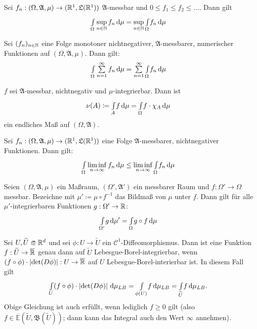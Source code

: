 \documentclass{cheat-sheet}
\newcommand{\Alg}{\mathfrak{A}}
\newcommand{\LebAlg}{\mathfrak{L}} %
\newcommand{\E}{\mathbb{E}} %
\newcommand{\ER}{\overline\R} %
\newcommand{\Bor}{\mathfrak{B}} %
\newcommand{\IntOmu}[1]{\Int{\Omega}{}{#1}{\mu}} %
\begin{document}


\begin{satz}
  Sei $f_n : (\Omega, \Alg, \mu) \to (\R^1, \LebAlg(\R^1))$ $\Alg$-messbar und $0 \leq f_1 \leq f_2 \leq ...$. Dann gilt
  \[ \IntOmu{\sup_{n \in \N} f_n} = \sup_{n \in \N} \IntOmu{f_n} \]
\end{satz}

\begin{satz}
  Sei $(f_n)_{n \in \mathbb{N}}$ eine Folge monotoner nichtnegativer, $\Alg$-messbarer, numerischer Funktionen auf $(\Omega, \Alg, \mu)$. Dann gilt:
  \[ \IntOmu{\sum_{n=1}^{\infty} f_n} = \sum_{n=1}^\infty \IntOmu{f_n} \]
\end{satz}

\begin{satz}
  $f$ sei $\Alg$-messbar, nichtnegativ und $\mu$-integrierbar. Dann ist
  \[ \nu(A) \coloneqq \Int{A}{}{f}{\mu} = \IntOmu{f \cdot \chi_A} \]
  ein endliches Maß auf $(\Omega, \Alg)$.
\end{satz}

\begin{satz}
  Sei $f_n : (\Omega, \Alg, \mu) \to (\R^1, \LebAlg(\R^1))$ eine Folge $\Alg$-messbarer, nichtnegativer Funktionen. Dann gilt:
  \[ \IntOmu{\liminf_{n \to \infty} f_n} \leq \liminf_{n \to \infty} \IntOmu{f_n} \]
\end{satz}




\begin{satz}
  Seien $(\Omega, \Alg, \mu)$ ein Maßraum, $(\Omega', \Alg')$ ein messbarer Raum und $f : \Omega' \to \Omega$ messbar. Bezeichne mit $\mu' \coloneqq \mu \circ f^{-1}$ das Bildmaß von $\mu$ unter $f$. Dann gilt für alle $\mu'$-integrierbaren Funktionen $g : \Omega' \to \mathbb{R}$:
  \[ \Int{\Omega'}{}{g}{\mu'} = \IntOmu{g \circ f} \]
\end{satz}

\begin{satz}[Transformationssatz]
  Sei $U, \widetilde{U} \opn \R^d$ und sei $\phi : U \to \widetilde{U}$ ein $\mathcal{C}^1$-Diffeomorphismus. Dann ist eine Funktion $f : \widetilde{U} \to \ER$ genau dann auf $\widetilde{U}$ Lebesgue-Borel-integrierbar, wenn $(f \circ \phi) \cdot \left|\det(D\phi)\right| : U \to \ER$ auf $U$ Lebesgue-Borel-interierbar ist. In diesem Fall gilt
  \[ {\textstyle \int\limits_{U}^{}} (f \circ \phi) \cdot \left|\det(D\phi)\right| \,\mathrm{d} \mu_{LB} = {\textstyle \int\limits_{\phi(U)}^{}} f \,\mathrm{d} \mu_{LB} = {\textstyle \int\limits_{\widetilde{U}}^{}} f \,\mathrm{d} \mu_{LB}. \]
  Obige Gleichung ist auch erfüllt, wenn lediglich $f \geq 0$ gilt (also $f \in \overline{\E}(\widetilde{U}, \Bor(\widetilde{U}))$; dann kann das Integral auch den Wert $\infty$ annehmen).
\end{satz}
\end{document}
